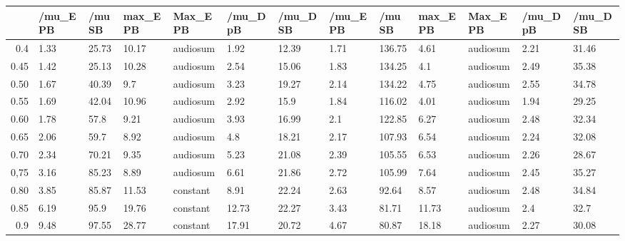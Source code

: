 \begin{table}[ht]
\centering
\begin{tabular}{rllllllllllll}
  \hline
 & /mu\_E PB & /mu SB & max\_E PB & Max\_E PB & /mu\_D pB & /mu\_D SB & /mu\_E PB & /mu SB & max\_E PB & Max\_E PB & /mu\_D pB & /mu\_D SB \\ 
  \hline
0.4 & 1.33 & 25.73 & 10.17 & audiosum & 1.92 & 12.39 & 1.71 & 136.75 & 4.61 & audiosum & 2.21 & 31.46 \\ 
  0.45 & 1.42 & 25.13 & 10.28 & audiosum & 2.54 & 15.06 & 1.83 & 134.25 & 4.1 & audiosum & 2.49 & 35.38 \\ 
  0.50 & 1.67 & 40.39 & 9.7 & audiosum & 3.23 & 19.27 & 2.14 & 134.22 & 4.75 & audiosum & 2.55 & 34.78 \\ 
  0.55 & 1.69 & 42.04 & 10.96 & audiosum & 2.92 & 15.9 & 1.84 & 116.02 & 4.01 & audiosum & 1.94 & 29.25 \\ 
  0.60 & 1.78 & 57.8 & 9.21 & audiosum & 3.93 & 16.99 & 2.1 & 122.85 & 6.27 & audiosum & 2.48 & 32.34 \\ 
  0.65 & 2.06 & 59.7 & 8.92 & audiosum & 4.8 & 18.21 & 2.17 & 107.93 & 6.54 & audiosum & 2.24 & 32.08 \\ 
  0.70 & 2.34 & 70.21 & 9.35 & audiosum & 5.23 & 21.08 & 2.39 & 105.55 & 6.53 & audiosum & 2.26 & 28.67 \\ 
  0,75 & 3.16 & 85.23 & 8.89 & audiosum & 6.61 & 21.86 & 2.72 & 105.99 & 7.64 & audiosum & 2.45 & 35.27 \\ 
  0.80 & 3.85 & 85.87 & 11.53 & constant & 8.91 & 22.24 & 2.63 & 92.64 & 8.57 & audiosum & 2.48 & 34.84 \\ 
  0.85 & 6.19 & 95.9 & 19.76 & constant & 12.73 & 22.27 & 3.43 & 81.71 & 11.73 & audiosum & 2.4 & 32.7 \\ 
  0.9 & 9.48 & 97.55 & 28.77 & constant & 17.91 & 20.72 & 4.67 & 80.87 & 18.18 & audiosum & 2.27 & 30.08 \\ 
   \hline
\end{tabular}
\end{table}
